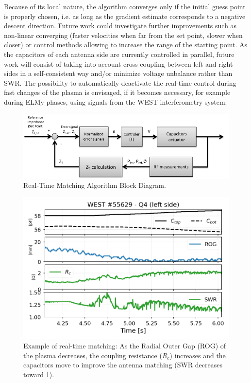 \documentclass[12p]{iopart}
\begin{document}
Because of its local nature, the algorithm converges only if the initial guess point is properly chosen, i.e. as long as the gradient estimate corresponds to a negative descent direction. Future work could investigate further improvements such as non-linear converging (faster velocities when far from the set point, slower when closer)\cite{durodie2017} or control methods allowing to increase the range of the starting point. As the capacitors of each antenna side are currently controlled in parallel, future work will consist of taking into account cross-coupling between left and right sides in a self-consistent way and/or minimize voltage unbalance rather than SWR. The possibility to automatically deactivate the real-time control during fast changes of the plasma is envisaged, if it becomes necessary, for example during ELMy phases, using signals from the WEST interferometry system.

\begin{figure}
	\centering
	\includegraphics[width=0.95\linewidth]{figures/ICRH_matching_blobk_diagram}
	\caption{Real-Time Matching Algorithm Block Diagram.}
	\label{fig:icrhmatchingblobkdiagram}
\end{figure}

\begin{figure}
	\centering
	\includegraphics[width=0.95\linewidth]{figures/WEST_IC_55629_auto_matching}
	\caption{Example of real-time matching: As the Radial Outer Gap (ROG) of the plasma decreases, the coupling resistance ($R_c$) increases and the capacitors move to improve the antenna matching (SWR decreases toward 1).}
	\label{fig:westic55629automatching}
\end{figure}
\end{document}
